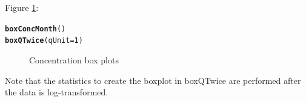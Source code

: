 \documentclass[a4paper,11pt]{article}\usepackage{graphicx, color}
\makeatletter
\newcommand{\hlfunctioncall}[1]{\textcolor[rgb]{0.501960784313725,0,0.329411764705882}{\textbf{#1}}}%
\newenvironment{kframe}{%
 \def\at@end@of@kframe{}%
 \ifinner\ifhmode%
  \def\at@end@of@kframe{\end{minipage}}%
  \begin{minipage}{\columnwidth}%
 \fi\fi%
 \def\FrameCommand##1{\hskip\@totalleftmargin \hskip-\fboxsep
 \colorbox{shadecolor}{##1}\hskip-\fboxsep
     \hskip-\linewidth \hskip-\@totalleftmargin \hskip\columnwidth}%
 \MakeFramed {\advance\hsize-\width
   \@totalleftmargin\z@ \linewidth\hsize
   \@setminipage}}%
 {\par\unskip\endMakeFramed%
 \at@end@of@kframe}
\newenvironment{knitrout}{}{} %
\makeatother
\begin{document}
Figure \ref{fig:plotBoxes}:
\begin{knitrout}
\color{fgcolor}\begin{kframe}
\begin{alltt}
\hlfunctioncall{boxConcMonth}()
\hlfunctioncall{boxQTwice}(qUnit=1)
\end{alltt}
\end{kframe}\begin{figure}[]
\caption[Concentration box plots]{Concentration box plots\label{fig:plotBoxes}}
\end{figure}


\end{knitrout}


Note that the statistics to create the boxplot in boxQTwice are performed after the data is log-transformed.
\end{document}
